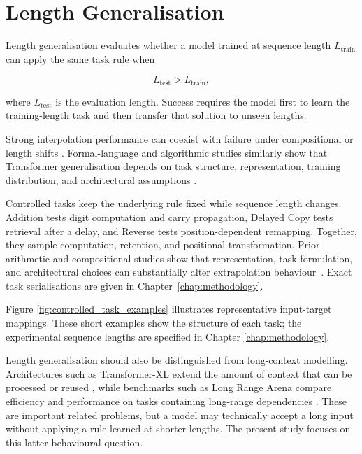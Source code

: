 \documentclass[
    author={Aanchala Ravindra Bhongade},
    supervisor={Dr. Fernando Moreno-Pino},
    degree={MSc},
    title={Length Generalisation in Transformer-Based Sequence Models: Failure Taxonomy and Mitigation Strategies},
    subtitle={},
    type={},
    year={2026}
]{dissertation}
\begin{document}
\section{Length Generalisation}

Length generalisation evaluates whether a model trained at sequence length
\(L_{\mathrm{train}}\) can apply the same task rule when

\[
L_{\mathrm{test}} > L_{\mathrm{train}},
\]

where \(L_{\mathrm{test}}\) is the evaluation length. Success requires the model first to learn the training-length task and then transfer that solution to unseen lengths.

Strong interpolation performance can coexist with failure under compositional or length shifts \cite{lake2018generalization,varis2021lengthdomain}. Formal-language and algorithmic studies similarly show that Transformer generalisation depends on task structure, representation, training distribution, and architectural assumptions \cite{bhattamishra2020formal,deletang2023neural,
strobl2024formal,zhou2024algorithms}.

Controlled tasks keep the underlying rule fixed while sequence length changes. Addition tests digit computation and carry propagation, Delayed Copy tests retrieval after a delay, and Reverse tests position-dependent remapping. Together, they sample computation, retention, and positional transformation. Prior arithmetic and compositional studies show that representation, task formulation, and architectural choices can substantially alter extrapolation behaviour~\cite{lee2024teaching,mcleish2024arithmetic,
ontanon2022compositional}. Exact task serialisations are given in
Chapter~\ref{chap:methodology}.

Figure \ref{fig:controlled_task_examples} illustrates representative
input-target mappings. These short examples show the structure of each task; the experimental sequence lengths are specified in
Chapter \ref{chap:methodology}.

Length generalisation should also be distinguished from long-context
modelling. Architectures such as Transformer-XL extend the amount of context that can be processed or reused \cite{dai2019transformerxl}, while benchmarks such as Long Range Arena compare efficiency and performance on tasks containing long-range dependencies \cite{tay2021longrange}. These are important related problems, but a model may technically accept a long input without applying a rule learned at shorter lengths. The present study focuses on this latter behavioural question.
\end{document}
